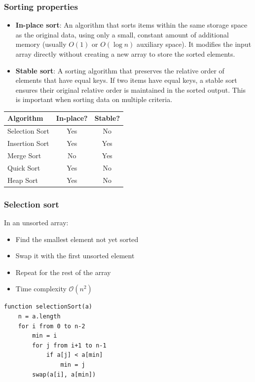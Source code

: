 \documentclass[8pt,aspectratio=169]{beamer}
\begin{document}
\begin{frame}
\frametitle{Sorting properties}
\begin{itemize}
	\item \textbf{In-place sort}: An algorithm that sorts items within the same storage space as the original data, using only a small, constant amount of additional memory (usually $O(1)$ or $O(\log n)$ auxiliary space). It modifies the input array directly without creating a new array to store the sorted elements.
	\item \textbf{Stable sort}: A sorting algorithm that preserves the relative order of elements that have equal keys. If two items have equal keys, a stable sort ensures their original relative order is maintained in the sorted output. This is important when sorting data on multiple criteria.
\end{itemize}
\vspace{0.5cm}
\centering
\begin{tabular}{l|c|c}
	\textbf{Algorithm} & \textbf{In-place?} & \textbf{Stable?} \\
	\hline
	Selection Sort & Yes & No \\
	Insertion Sort & Yes & Yes \\
	Merge Sort & No & Yes \\
	Quick Sort & Yes & No \\
	Heap Sort & Yes & No \\
\end{tabular}
\end{frame}

\begin{frame}[fragile]
\frametitle{Selection sort}
In an unsorted array:
\begin{itemize}
	\item Find the smallest element not yet sorted
	\item Swap it with the first unsorted element
	\item Repeat for the rest of the array
	\item Time complexity $\mathcal{O}(n^2)$
\end{itemize}

    \begin{lstlisting}[basicstyle=\tiny\ttfamily, frame=single]
function selectionSort(a)
    n = a.length
    for i from 0 to n-2
        min = i
        for j from i+1 to n-1
            if a[j] < a[min]
                min = j
        swap(a[i], a[min])
\end{lstlisting}
\end{frame}
\end{document}
